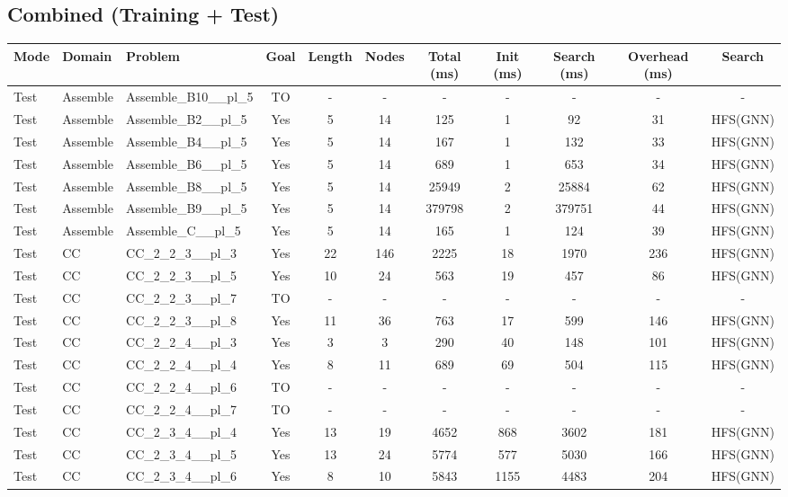 \documentclass{article}
\begin{document}
\subsection*{Combined (Training + Test)}
\begin{tabular}{lllcccccccc}
\toprule
Mode & Domain & Problem & Goal & Length & Nodes & Total (ms) & Init (ms) & Search (ms) & Overhead (ms) & Search \\
\midrule
Test & Assemble & Assemble\_B10\_\_pl\_5 & TO & - & - & - & - & - & - & - \\
Test & Assemble & Assemble\_B2\_\_pl\_5 & Yes & 5 & 14 & 125 & 1 & 92 & 31 & HFS(GNN) \\
Test & Assemble & Assemble\_B4\_\_pl\_5 & Yes & 5 & 14 & 167 & 1 & 132 & 33 & HFS(GNN) \\
Test & Assemble & Assemble\_B6\_\_pl\_5 & Yes & 5 & 14 & 689 & 1 & 653 & 34 & HFS(GNN) \\
Test & Assemble & Assemble\_B8\_\_pl\_5 & Yes & 5 & 14 & 25949 & 2 & 25884 & 62 & HFS(GNN) \\
Test & Assemble & Assemble\_B9\_\_pl\_5 & Yes & 5 & 14 & 379798 & 2 & 379751 & 44 & HFS(GNN) \\
Test & Assemble & Assemble\_C\_\_pl\_5 & Yes & 5 & 14 & 165 & 1 & 124 & 39 & HFS(GNN) \\
Test & CC & CC\_2\_2\_3\_\_pl\_3 & Yes & 22 & 146 & 2225 & 18 & 1970 & 236 & HFS(GNN) \\
Test & CC & CC\_2\_2\_3\_\_pl\_5 & Yes & 10 & 24 & 563 & 19 & 457 & 86 & HFS(GNN) \\
Test & CC & CC\_2\_2\_3\_\_pl\_7 & TO & - & - & - & - & - & - & - \\
Test & CC & CC\_2\_2\_3\_\_pl\_8 & Yes & 11 & 36 & 763 & 17 & 599 & 146 & HFS(GNN) \\
Test & CC & CC\_2\_2\_4\_\_pl\_3 & Yes & 3 & 3 & 290 & 40 & 148 & 101 & HFS(GNN) \\
Test & CC & CC\_2\_2\_4\_\_pl\_4 & Yes & 8 & 11 & 689 & 69 & 504 & 115 & HFS(GNN) \\
Test & CC & CC\_2\_2\_4\_\_pl\_6 & TO & - & - & - & - & - & - & - \\
Test & CC & CC\_2\_2\_4\_\_pl\_7 & TO & - & - & - & - & - & - & - \\
Test & CC & CC\_2\_3\_4\_\_pl\_4 & Yes & 13 & 19 & 4652 & 868 & 3602 & 181 & HFS(GNN) \\
Test & CC & CC\_2\_3\_4\_\_pl\_5 & Yes & 13 & 24 & 5774 & 577 & 5030 & 166 & HFS(GNN) \\
Test & CC & CC\_2\_3\_4\_\_pl\_6 & Yes & 8 & 10 & 5843 & 1155 & 4483 & 204 & HFS(GNN) \\

\end{tabular}
\end{document}

